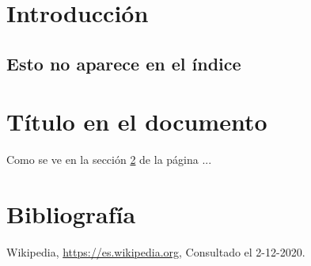 \documentclass[]{article}
\begin{document}
    
    


    \section{Introducción}
    
     \subsection*{Esto no aparece en el índice}

\newpage
    \section[Título para el índice]{Título en el documento}
    \label{sec:1}

    Como se ve en la sección \ref{sec:1} de la página \pageref{sec:1}...



\newpage
    \appendix
    \section{Bibliografía}
     
     \begin{thebibliography}{x}
     
      Wikipedia, \url{https://es.wikipedia.org}, Consultado el 2-12-2020.
     
     
     
     
     \end{thebibliography}
    
    
    
\end{document}
